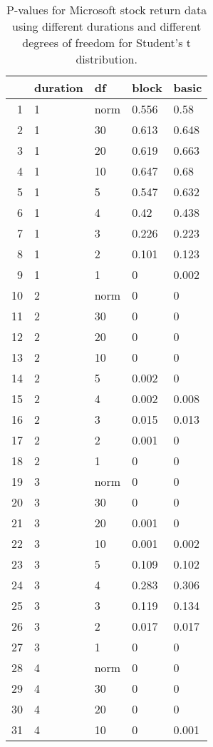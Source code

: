 \begin{table}[ht]
\centering
\caption{P-values for Microsoft stock return data using different durations
  and different degrees of freedom for Student's t distribution.} 
\label{table:microsoft}
\begin{tabular}{rllll}
  \hline
 & duration & df & block & basic \\ 
  \hline
1 & 1 & norm & 0.556 & 0.58 \\ 
  2 & 1 & 30 & 0.613 & 0.648 \\ 
  3 & 1 & 20 & 0.619 & 0.663 \\ 
  4 & 1 & 10 & 0.647 & 0.68 \\ 
  5 & 1 & 5 & 0.547 & 0.632 \\ 
  6 & 1 & 4 & 0.42 & 0.438 \\ 
  7 & 1 & 3 & 0.226 & 0.223 \\ 
  8 & 1 & 2 & 0.101 & 0.123 \\ 
  9 & 1 & 1 & 0 & 0.002 \\ 
  10 & 2 & norm & 0 & 0 \\ 
  11 & 2 & 30 & 0 & 0 \\ 
  12 & 2 & 20 & 0 & 0 \\ 
  13 & 2 & 10 & 0 & 0 \\ 
  14 & 2 & 5 & 0.002 & 0 \\ 
  15 & 2 & 4 & 0.002 & 0.008 \\ 
  16 & 2 & 3 & 0.015 & 0.013 \\ 
  17 & 2 & 2 & 0.001 & 0 \\ 
  18 & 2 & 1 & 0 & 0 \\ 
  19 & 3 & norm & 0 & 0 \\ 
  20 & 3 & 30 & 0 & 0 \\ 
  21 & 3 & 20 & 0.001 & 0 \\ 
  22 & 3 & 10 & 0.001 & 0.002 \\ 
  23 & 3 & 5 & 0.109 & 0.102 \\ 
  24 & 3 & 4 & 0.283 & 0.306 \\ 
  25 & 3 & 3 & 0.119 & 0.134 \\ 
  26 & 3 & 2 & 0.017 & 0.017 \\ 
  27 & 3 & 1 & 0 & 0 \\ 
  28 & 4 & norm & 0 & 0 \\ 
  29 & 4 & 30 & 0 & 0 \\ 
  30 & 4 & 20 & 0 & 0 \\ 
  31 & 4 & 10 & 0 & 0.001 \\ 

\end{tabular}
\end{table}

